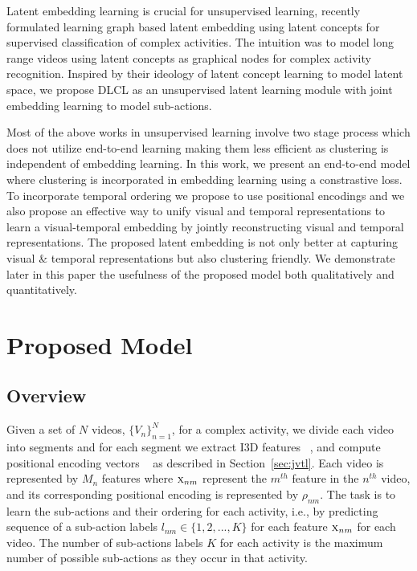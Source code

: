 \documentclass[final]{cvpr}
\begin{document}
\par Latent embedding learning is crucial for unsupervised learning, recently~\cite{hussein2019videograph} formulated learning graph based latent embedding using latent concepts for supervised classification of complex activities. The intuition was to model long range videos using latent concepts as graphical nodes for complex activity recognition. Inspired by their ideology of latent concept learning to model latent space, we propose DLCL as an unsupervised latent learning module with joint embedding learning to model sub-actions.


\par Most of the above works in unsupervised learning involve two stage process which does not utilize end-to-end learning making them less efficient as clustering is independent of embedding learning. In this work, we present an end-to-end model where clustering is incorporated in embedding learning using a constrastive loss. To incorporate temporal ordering we propose to use positional encodings and we also propose an effective way to unify visual and temporal representations to learn a visual-temporal embedding by jointly reconstructing visual and temporal representations.
The proposed latent embedding is not only better at capturing visual \& temporal representations but also clustering friendly. 
We demonstrate later in this paper the usefulness of the proposed model both qualitatively and quantitatively. 



\section{Proposed Model}
\subsection{Overview}
\label{sec:overview}
\par Given a set of $N$ videos, $\{V_{n}\}_{n=1}^{N}$, for a complex activity, we divide each video into segments and for each segment we extract I3D features~\cite{rl-a-carreira2017quo} %
, and compute positional encoding vectors ~\cite{vaswani2017attention} as described in Section~\ref{sec:jvtl}. %
Each video 
is represented by $M_{n}$ features where $\textsc{x}_{nm}$ represent the $m^{th}$ feature in the $n^{th}$ video, and its corresponding positional encoding is represented by $\rho_{nm}$. The task is to learn the sub-actions and their ordering for each activity, i.e., by predicting sequence of a sub-action labels $l_{nm} \in \{1,2,...,K\}$ for each feature $\textsc{x}_{nm}$ for each video. The number of sub-actions labels $K$ for each activity is the maximum number of possible sub-actions as they occur in that activity. 
\end{document}
